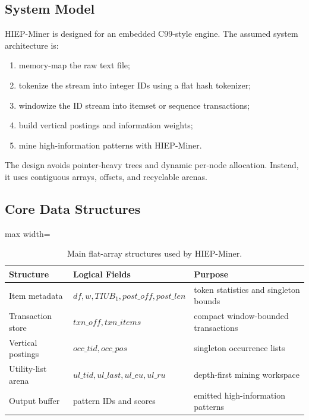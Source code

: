 \documentclass[11pt,a4paper]{article}
\begin{document}
\subsection{System Model}

HIEP-Miner is designed for an embedded C99-style engine. The assumed system architecture is:

\begin{enumerate}[label=(\arabic*)]
    \item memory-map the raw text file;
    \item tokenize the stream into integer IDs using a flat hash tokenizer;
    \item windowize the ID stream into itemset or sequence transactions;
    \item build vertical postings and information weights;
    \item mine high-information patterns with HIEP-Miner.
\end{enumerate}

The design avoids pointer-heavy trees and dynamic per-node allocation. Instead, it uses contiguous arrays, offsets, and recyclable arenas.

\subsection{Core Data Structures}

\begin{table}[H]
\centering
\caption{Main flat-array structures used by HIEP-Miner.}
\label{tab:structures}
\small
\begin{adjustbox}{max width=\textwidth}
\begin{tabular}{lll}
\toprule
Structure & Logical Fields & Purpose \\
\midrule
Item metadata & \(df, w, TIUB_1, post\_off, post\_len\) & token statistics and singleton bounds \\
Transaction store & \(txn\_off, txn\_items\) & compact window-bounded transactions \\
Vertical postings & \(occ\_tid, occ\_pos\) & singleton occurrence lists \\
Utility-list arena & \(ul\_tid, ul\_last, ul\_eu, ul\_ru\) & depth-first mining workspace \\
Output buffer & pattern IDs and scores & emitted high-information patterns \\
\bottomrule
\end{tabular}
\end{adjustbox}
\end{table}
\end{document}

